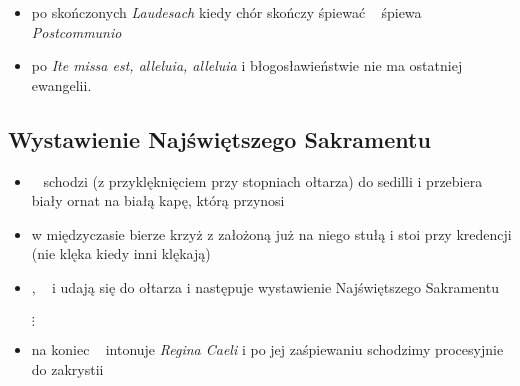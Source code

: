 \begin{itemize}
\begin{itemize}
\begin{itemize}
			            \item \ii~ staje po stornie epistoły (towarzyszy ) i
			                  czyta śpiewaną Antyfonę
			            \item kiedy chór zakończy śpiew Antyfony, \ii~ intonuje
			                  Antyfonę do Kantyku Zachariasza (\textit{Et valde
				                  mane}), a dalej śpiewa chór
			            \item następnie \ii~ czyta, a chór śpiewa Kantyk
			                  Zachariasza (\textit{Benedictus Dominus})
			                  \footnote{Żegnamy się kiedy chór śpiewa
				                  \textit{Benedictus}, czyli na początku Kantyku}
			            \item kiedy \ii~ skończy czytać następuje normalne
			                  zasypanie i okadzenie ołtarza oraz usługujących i
			                  wiernych (tak jak podczas ofiarowania z
							  wyłączeniem okadzenia darów)
		            \end{itemize}
		      \item po skończonych \textit{Laudesach} kiedy chór skończy śpiewać
		            \ii~ śpiewa \textit{Postcommunio}
		      \item po \textit{Ite missa est, alleluia, alleluia} i błogosławieństwie nie
		            ma ostatniej ewangelii.
	      \end{itemize}
\end{itemize}

\subsection{Wystawienie Najświętszego Sakramentu}

\begin{itemize}
	\item \ii~ schodzi (z przyklęknięciem przy stopniach ołtarza) do sedilli i
	      przebiera biały ornat na białą kapę, którą przynosi 
	\item w międzyczasie  bierze krzyż z założoną już na niego stułą i
	      stoi przy kredencji (nie klęka kiedy inni klękają)
	\item {}, \ii~ i  udają się do ołtarza i następuje wystawienie
	      Najświętszego Sakramentu\\\\$\vdots$


	\item na koniec \ii~ intonuje \textit{Regina Caeli} i po jej zaśpiewaniu
	      schodzimy procesyjnie do zakrystii
\end{itemize}